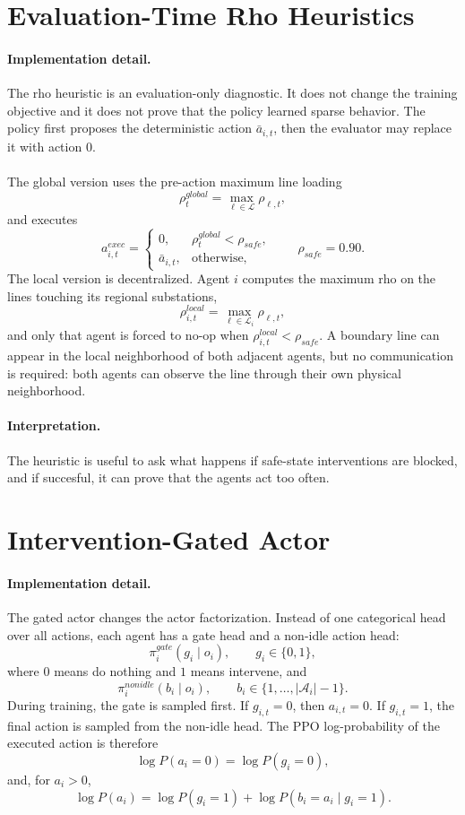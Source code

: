 \section{Evaluation-Time Rho Heuristics}
\label{subsec:sparse-control-heuristics}

\paragraph{Implementation detail.}
The rho heuristic is an evaluation-only diagnostic. It does not change the
training objective and it does not prove that the policy learned sparse
behavior. The policy first proposes the deterministic action \(\bar a_{i,t}\),
then the evaluator may replace it with action \(0\).
\\
\\
The global version uses the pre-action maximum line loading
\[
  \rho_t^{global}=\max_{\ell\in\mathcal L}\rho_{\ell,t},
\]
and executes
\[
  a_{i,t}^{exec}=
  \begin{cases}
    0, & \rho_t^{global}<\rho_{safe},\\
    \bar a_{i,t}, & \text{otherwise,}
  \end{cases}
  \qquad \rho_{safe}=0.90.
\]
The local version is decentralized. Agent \(i\) computes the maximum rho on the
lines touching its regional substations,
\[
  \rho_{i,t}^{local}=\max_{\ell\in\mathcal L_i}\rho_{\ell,t},
\]
and only that agent is forced to no-op when
\(\rho_{i,t}^{local}<\rho_{safe}\). A boundary line can appear in the local
neighborhood of both adjacent agents, but no communication is required: both
agents can observe the line through their own physical neighborhood.

\paragraph{Interpretation.}
The heuristic is useful to ask what happens if safe-state interventions are
blocked, and if succesful, it can prove that the agents act too often.

\section{Intervention-Gated Actor}
\label{subsec:sparse-control-gate}

\paragraph{Implementation detail.}
The gated actor changes the actor factorization. Instead of one categorical
head over all actions, each agent has a gate head and a non-idle action head:
\[
  \pi_i^{gate}(g_i\mid o_i),\qquad g_i\in\{0,1\},
\]
where \(0\) means do nothing and \(1\) means intervene, and
\[
  \pi_i^{nonidle}(b_i\mid o_i),\qquad
  b_i\in\{1,\ldots,|\mathcal A_i|-1\}.
\]
During training, the gate is sampled first. If \(g_{i,t}=0\), then
\(a_{i,t}=0\). If \(g_{i,t}=1\), the final action is sampled from the non-idle
head. The PPO log-probability of the executed action is therefore
\[
  \log P(a_i=0)=\log P(g_i=0),
\]
and, for \(a_i>0\),
\[
  \log P(a_i)=\log P(g_i=1)+\log P(b_i=a_i\mid g_i=1).
\]

